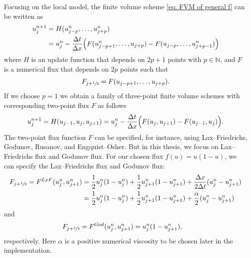 Focusing on the local model, the finite volume scheme \eqref{eq: FVM of general f} can be written as
\begin{equation}\label{eq:generic_H}
    \begin{split}
        u_{j}^{n+1} & = H(u_{j-p}^n,\dots, u_{j+p}^n)                                                                                 \\
                    & = u_{j}^{n} - \frac{\Delta t}{\Delta x} \Bigl(F(u_{j-p+1}^n,\dots,u_{j+p}) - F(u_{j-p},\dots,u_{j+p-1}^n)\Bigr)
    \end{split}
\end{equation}
where $H$ is an update function that depends on $2p+1$ points with $p \in \mathbb{N}$, and $F$ is a numerical flux that depends on $2p$ points such that
\[
    F_{j+\sfrac{1}{2}} = F(u_{j-p+1},\dots,u_{j+p}).
\]
If we choose $p=1$ we obtain a family of three-point finite volume schemes with corresponding two-point flux $F$ as follows
\begin{equation}\label{eq:three_point_H}
    \begin{split}
        u_{j}^{n+1}  = H(u_{j-1},u_{j},u_{j+1}) = u_{j}^{n} - \frac{\Delta t}{\Delta x} \Bigl(F(u_{j},u_{j+1}) - F(u_{j-1},u_{j})\Bigr).
    \end{split}
\end{equation}
The two-point flux function $F$ can be specified, for instance, using  Lax--Friedrichs, Godunov, Rusanov, and Engquist--Osher. But in this thesis, we focus on Lax--Friedrichs flux and Godunov flux.
For our chosen flux $f(u)=u(1-u)$, we can specify the Lax--Friedrichs flux and Godunov flux:
\begin{equation}\label{eq:Lax_F}
    \begin{split}
        F_{j+\sfrac{1}{2}}  = F^{LxF}(u_{j}^{n},u_{j+1}^{n}) & =  \frac{1}{2} u_{j}^n (1-u_{j}^n) + \frac{1}{2}u_{j+1}^n (1-u_{j+1}^n) + \frac{\Delta x}{2 \Delta t} (u_{j}^n - u_{j+1}^n) \\
                                                             & = \frac{1}{2} u_{j}^n (1-u_{j}^n) + \frac{1}{2}u_{j+1}^n (1-u_{j+1}^n) + \frac{\alpha}{2} (u_{j}^n - u_{j+1}^n)
    \end{split}
\end{equation}
and
\begin{equation}\label{eq:God_F}
    \begin{split}
        F_{j+\sfrac{1}{2}} & = F^{God}(u_{j}^{n},u_{j+1}^{n}) = u_{j}^n (1-u_{j+1}^n),
    \end{split}
\end{equation}
respectively. Here $\alpha $ is a positive numerical viscosity to be chosen later in the implementation.

